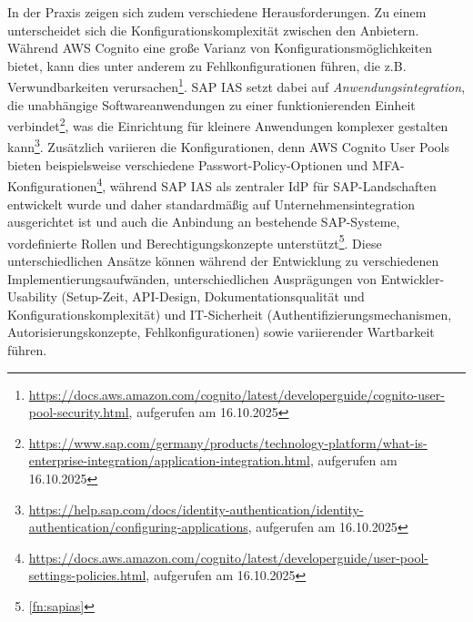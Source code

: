 In der Praxis zeigen sich zudem verschiedene Herausforderungen. Zu einem unterscheidet sich die Konfigurationskomplexität zwischen den Anbietern. Während AWS Cognito eine große Varianz von Konfigurationsmöglichkeiten bietet, kann dies unter anderem zu Fehlkonfigurationen führen, die z.B. Verwundbarkeiten verursachen\footnote{\url{https://docs.aws.amazon.com/cognito/latest/developerguide/cognito-user-pool-security.html}, aufgerufen am 16.10.2025}. \ac{SAP IAS} setzt dabei auf \textit{Anwendungsintegration}, die unabhängige Softwareanwendungen zu einer funktionierenden Einheit verbindet\footnote{\url{https://www.sap.com/germany/products/technology-platform/what-is-enterprise-integration/application-integration.html}, aufgerufen am 16.10.2025}, was die Einrichtung für kleinere Anwendungen komplexer gestalten kann\footnote{\url{https://help.sap.com/docs/identity-authentication/identity-authentication/configuring-applications}, aufgerufen am 16.10.2025}. Zusätzlich variieren die Konfigurationen, denn AWS Cognito User Pools bieten beispielsweise verschiedene Passwort-Policy-Optionen und MFA-Konfigurationen\footnote{\url{https://docs.aws.amazon.com/cognito/latest/developerguide/user-pool-settings-policies.html}, aufgerufen am 16.10.2025}, während \ac{SAP IAS} als zentraler \ac{IdP} für SAP-Landschaften entwickelt wurde und daher standardmäßig auf Unternehmensintegration ausgerichtet ist und auch die Anbindung an bestehende SAP-Systeme, vordefinierte Rollen und Berechtigungskonzepte unterstützt\footnote{\ref{fn:sapias}}. Diese unterschiedlichen Ansätze können während der Entwicklung zu verschiedenen Implementierungsaufwänden, unterschiedlichen Ausprägungen von Entwickler-Usability (Setup-Zeit, API-Design, Dokumentationsqualität und Konfigurationskomplexität) und IT-Sicherheit (Authentifizierungsmechanismen, Autorisierungskonzepte, Fehlkonfigurationen) sowie variierender Wartbarkeit führen.

